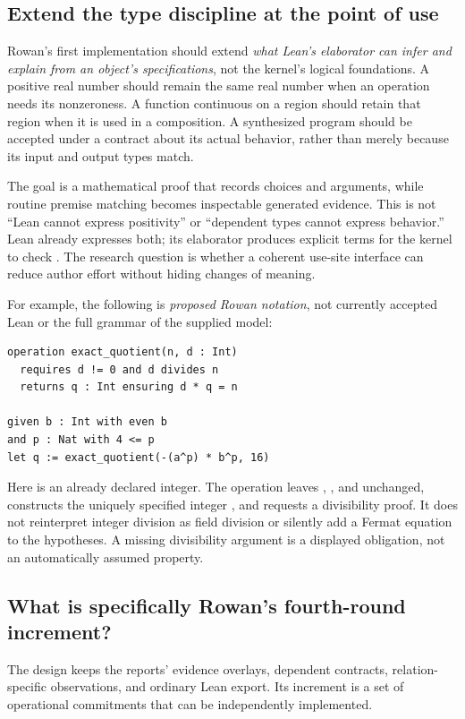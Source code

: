 \documentclass[11pt,letterpaper]{article}
\newcommand{\code}[1]{\texttt{\detokenize{#1}}}
\theoremstyle{definition}\newtheorem{definition}[theorem]{Definition}
\theoremstyle{remark}\newtheorem{remark}[theorem]{Remark}
\begin{document}
\subsection{Extend the type discipline at the point of use}
Rowan's first implementation should extend \emph{what Lean's elaborator can
infer and explain from an object's specifications}, not the kernel's logical
foundations. A positive real number should remain the same real number when
an operation needs its nonzeroness. A function continuous on a region should
retain that region when it is used in a composition. A synthesized program
should be accepted under a contract about its actual behavior, rather than
merely because its input and output types match.

The goal is a mathematical proof that records choices and arguments, while
routine premise matching becomes inspectable generated evidence. This is not
``Lean cannot express positivity'' or ``dependent types cannot express
behavior.'' Lean already expresses both; its elaborator produces explicit
terms for the kernel to check \cite{lean-type}. The research question is
whether a coherent use-site interface can reduce author effort without hiding
changes of meaning.

For example, the following is \emph{proposed Rowan notation}, not currently
accepted Lean or the full grammar of the supplied model:
\begin{lstlisting}
operation exact_quotient(n, d : Int)
  requires d != 0 and d divides n
  returns q : Int ensuring d * q = n

given b : Int with even b
and p : Nat with 4 <= p
let q := exact_quotient(-(a^p) * b^p, 16)
\end{lstlisting}
Here \code{a} is an already declared integer. The operation leaves \code{a},
\code{b}, and \code{p} unchanged, constructs the uniquely specified integer
\code{q}, and requests a divisibility proof. It does not reinterpret integer
division as field division or silently add a Fermat equation to the hypotheses.
A missing divisibility argument is a displayed obligation, not an automatically
assumed property.

\subsection{What is specifically Rowan's fourth-round increment?}
The design keeps the reports' evidence overlays, dependent contracts,
relation-specific observations, and ordinary Lean export. Its increment is a
set of operational commitments that can be independently implemented.
\end{document}
